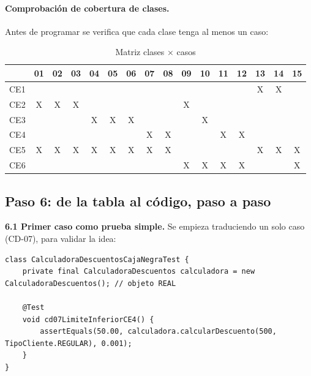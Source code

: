 \documentclass[11pt,a4paper,oneside]{report}
\begin{document}
\paragraph{Comprobación de cobertura de clases.} Antes de programar se verifica que cada clase tenga al menos un caso:

\begin{table}[H]
\centering
\caption{Matriz clases $\times$ casos}
\scriptsize
\setlength{\tabcolsep}{3pt}
\begin{tabular}{l*{15}{c}}
\toprule
& 01 & 02 & 03 & 04 & 05 & 06 & 07 & 08 & 09 & 10 & 11 & 12 & 13 & 14 & 15\\
\midrule
CE1 & & & & & & & & & & & & & X & X & \\
CE2 & X & X & X & & & & & & X & & & & & & \\
CE3 & & & & X & X & X & & & & X & & & & & \\
CE4 & & & & & & & X & X & & & X & X & & & \\
CE5 & X & X & X & X & X & X & X & X & & & & & X & X & X\\
CE6 & & & & & & & & & X & X & X & X & & & X\\
\bottomrule
\end{tabular}
\end{table}

\subsection{Paso 6: de la tabla al código, paso a paso}
\textbf{6.1 Primer caso como prueba simple.} Se empieza traduciendo un solo caso (CD-07), para validar la idea:
\begin{lstlisting}[caption={Un caso aislado}]
class CalculadoraDescuentosCajaNegraTest {
    private final CalculadoraDescuentos calculadora = new CalculadoraDescuentos(); // objeto REAL

    @Test
    void cd07LimiteInferiorCE4() {
        assertEquals(50.00, calculadora.calcularDescuento(500, TipoCliente.REGULAR), 0.001);
    }
}
\end{lstlisting}
\end{document}
